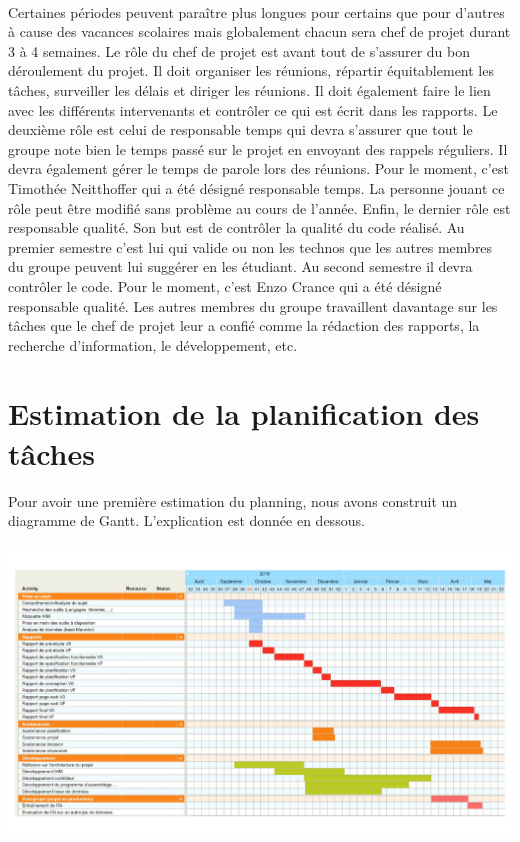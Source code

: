 \paragraph{}
Certaines périodes peuvent paraître plus longues pour certains que pour d’autres à cause des vacances
scolaires mais globalement chacun sera chef de projet durant 3 à 4 semaines. Le rôle du chef de projet est
avant tout de s’assurer du bon déroulement du projet. Il doit organiser les réunions, répartir équitablement
les tâches, surveiller les délais et diriger les réunions. Il doit également faire le lien avec les
différents intervenants et contrôler ce qui est écrit dans les rapports. Le deuxième rôle est celui de
responsable temps qui devra s’assurer que tout le groupe note bien le temps passé sur le projet en envoyant
des rappels réguliers. Il devra également gérer le temps de parole lors des réunions. Pour le moment,
c’est Timothée Neitthoffer qui a été désigné responsable temps. La personne jouant ce rôle peut être
modifié sans problème au cours de l’année. Enfin, le dernier rôle est responsable qualité. Son but est de
contrôler la qualité du code réalisé. Au premier semestre c’est lui qui valide ou non les technos que les
autres membres du groupe peuvent lui suggérer en les étudiant. Au second semestre il devra contrôler le code.
Pour le moment, c’est Enzo Crance qui a été désigné responsable qualité. Les autres membres du groupe travaillent
davantage sur les tâches que le chef de projet leur a confié comme la rédaction des rapports, la
recherche d’information, le développement, etc.

\section{Estimation de la planification des tâches}

Pour avoir une première estimation du planning, nous avons construit un diagramme de Gantt. L’explication est donnée en dessous.

\paragraph{}
\begin{mdframed}[frametitle={Estimation de la planification des tâches}, innerbottommargin=10]
\begin{center}
\includegraphics[width=\linewidth]{gantt.pdf}
\end{center}
\end{mdframed}

